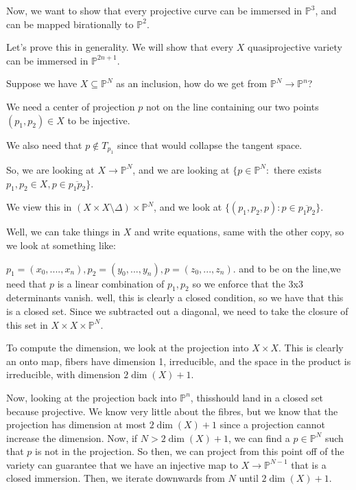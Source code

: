 \documentclass[10pt]{article}
\begin{document}
Now, we want to show that every projective curve can be immersed in $\mathbb{P}^3$, and can be mapped birationally to $\mathbb{P}^2$.

Let’s prove this in generality. We will show that every $X$ quasiprojective variety can be immersed in $\mathbb{P}^{2n + 1}$.

Suppose we have $X \subseteq \mathbb{P}^N$ as an inclusion, how do we get from $\mathbb{P}^N \to \mathbb{P}^n$?

We need a center of projection $p$ not on the line containing our two points $(p_1,p_2) \in X$ to be injective. 

We also need that $p \not \in T_{p_1}$ since that would collapse the tangent space.

So, we are looking at $X \to \mathbb{P}^N$, and we are looking at $\{ p \in \mathbb{P}^N : $ there exists $ p_1, p_2 \in X, p \in \overline{p_1p_2} \}$. 

We view this in $(X \times X \setminus \Delta) \times \mathbb{P}^N$, and we look at $\{ (p_1, p_2, p) : p \in \overline{p_1p_2} \}$.

Well, we can take things in $X$ and write equations, same with the other copy, so we look at something like:

$p_1 = (x_0,....,x_n), p_2 = (y_0,...,y_n), p = (z_0,...,z_n)$. and to be on the line,we need that $p$ is a linear combination of $p_1, p_2$ so we enforce that the 3x3 determinants vanish. well, this is clearly a closed condition, so we have that this is a closed set. Since we subtracted out a diagonal, we need to take the closure of this set in $X \times X \times \mathbb{P}^N$. 

To compute the dimension, we look at the projection into $X \times X$. This is clearly an onto map, fibers have dimension 1, irreducible, and the space in the product is irreducible, with dimension $2 \dim(X) + 1$.

Now, looking at the projection back into $\mathbb{P}^n$, thisshould land in a closed set because projective. We know very little about the fibres, but we know that the projection has dimension at most $2 \dim(X) +1$ since a projection cannot increase the dimension. Now, if $N > 2 \dim(X) +1$, we can find a $p \in \mathbb{P}^N$ such that $p$ is not in the projection. So then, we can project from this point off of the variety can guarantee that we have an injective map to $X \to \mathbb{P}^{N-1}$ that is a closed immersion. Then, we iterate downwards from $N$ until $2 \dim(X) +1$.
\end{document}
